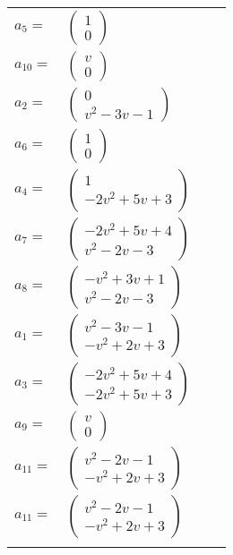 \documentclass[1p]{elsarticle_modified}
\theoremstyle{definition}
\begin{document}
\begin{tabular}{m{7pt} m{180pt} m{7pt} m{180pt} }
\flushright $a_{5}=$&$\begin{pmatrix}1\\0\end{pmatrix}$ \\
\flushright $a_{10}=$&$\begin{pmatrix}v\\0\end{pmatrix}$ \\
\flushright $a_{2}=$&$\begin{pmatrix}0\\v^2-3 v-1\end{pmatrix}$ \\
\flushright $a_{6}=$&$\begin{pmatrix}1\\0\end{pmatrix}$ \\
\flushright $a_{4}=$&$\begin{pmatrix}1\\-2 v^2+5 v+3\end{pmatrix}$ \\
\flushright $a_{7}=$&$\begin{pmatrix}-2 v^2+5 v+4\\v^2-2 v-3\end{pmatrix}$ \\
\flushright $a_{8}=$&$\begin{pmatrix}- v^2+3 v+1\\v^2-2 v-3\end{pmatrix}$ \\
\flushright $a_{1}=$&$\begin{pmatrix}v^2-3 v-1\\- v^2+2 v+3\end{pmatrix}$ \\
\flushright $a_{3}=$&$\begin{pmatrix}-2 v^2+5 v+4\\-2 v^2+5 v+3\end{pmatrix}$ \\
\flushright $a_{9}=$&$\begin{pmatrix}v\\0\end{pmatrix}$ \\
\flushright $a_{11}=$&$\begin{pmatrix}v^2-2 v-1\\- v^2+2 v+3\end{pmatrix}$\\ \flushright $a_{11}=$&$\begin{pmatrix}v^2-2 v-1\\- v^2+2 v+3\end{pmatrix}$\\&\end{tabular}
\end{document}
